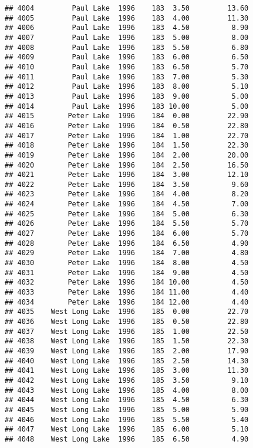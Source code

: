 \documentclass[
]{article}
\begin{document}
\begin{verbatim}
## 4004         Paul Lake  1996    183  3.50         13.60
## 4005         Paul Lake  1996    183  4.00         11.30
## 4006         Paul Lake  1996    183  4.50          8.90
## 4007         Paul Lake  1996    183  5.00          8.00
## 4008         Paul Lake  1996    183  5.50          6.80
## 4009         Paul Lake  1996    183  6.00          6.50
## 4010         Paul Lake  1996    183  6.50          5.70
## 4011         Paul Lake  1996    183  7.00          5.30
## 4012         Paul Lake  1996    183  8.00          5.10
## 4013         Paul Lake  1996    183  9.00          5.00
## 4014         Paul Lake  1996    183 10.00          5.00
## 4015        Peter Lake  1996    184  0.00         22.90
## 4016        Peter Lake  1996    184  0.50         22.80
## 4017        Peter Lake  1996    184  1.00         22.70
## 4018        Peter Lake  1996    184  1.50         22.30
## 4019        Peter Lake  1996    184  2.00         20.00
## 4020        Peter Lake  1996    184  2.50         16.50
## 4021        Peter Lake  1996    184  3.00         12.10
## 4022        Peter Lake  1996    184  3.50          9.60
## 4023        Peter Lake  1996    184  4.00          8.20
## 4024        Peter Lake  1996    184  4.50          7.00
## 4025        Peter Lake  1996    184  5.00          6.30
## 4026        Peter Lake  1996    184  5.50          5.70
## 4027        Peter Lake  1996    184  6.00          5.70
## 4028        Peter Lake  1996    184  6.50          4.90
## 4029        Peter Lake  1996    184  7.00          4.80
## 4030        Peter Lake  1996    184  8.00          4.50
## 4031        Peter Lake  1996    184  9.00          4.50
## 4032        Peter Lake  1996    184 10.00          4.50
## 4033        Peter Lake  1996    184 11.00          4.40
## 4034        Peter Lake  1996    184 12.00          4.40
## 4035    West Long Lake  1996    185  0.00         22.70
## 4036    West Long Lake  1996    185  0.50         22.80
## 4037    West Long Lake  1996    185  1.00         22.50
## 4038    West Long Lake  1996    185  1.50         22.30
## 4039    West Long Lake  1996    185  2.00         17.90
## 4040    West Long Lake  1996    185  2.50         14.30
## 4041    West Long Lake  1996    185  3.00         11.30
## 4042    West Long Lake  1996    185  3.50          9.10
## 4043    West Long Lake  1996    185  4.00          8.00
## 4044    West Long Lake  1996    185  4.50          6.30
## 4045    West Long Lake  1996    185  5.00          5.90
## 4046    West Long Lake  1996    185  5.50          5.40
## 4047    West Long Lake  1996    185  6.00          5.10
## 4048    West Long Lake  1996    185  6.50          4.90

\end{verbatim}
\end{document}
